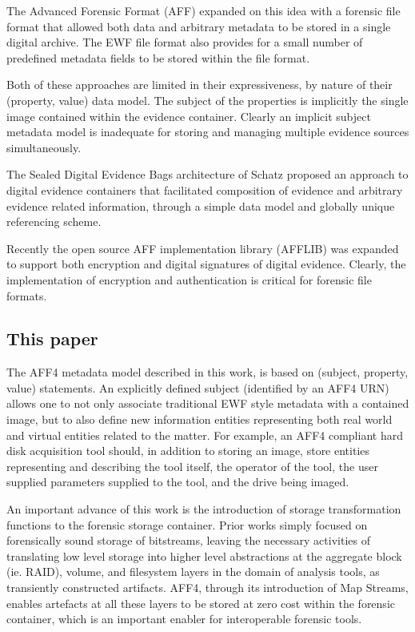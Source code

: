 \documentclass[10pt, conference]{IEEEtran}
\begin{document}
The Advanced Forensic Format (AFF) expanded on this idea with a
forensic file format that allowed both data and arbitrary metadata to
be stored in a single digital archive\cite{garfinkel:aff}. The EWF
file format also provides for a small number of predefined metadata
fields to be stored within the file format\cite{libewf}.

Both of these approaches are limited in their expressiveness, by
nature of their (property, value) data model. The subject of the
properties is implicitly the single image contained within the
evidence container. Clearly an implicit subject metadata model is
inadequate for storing and managing multiple evidence sources
simultaneously.

The Sealed Digital Evidence Bags architecture of Schatz proposed an
approach to digital evidence containers that facilitated composition
of evidence and arbitrary evidence related information, through a
simple data model and globally unique referencing
scheme\cite{schatz:sdeb}. 

Recently the open source AFF implementation library (AFFLIB) was
expanded to support both encryption and digital signatures of digital
evidence\cite{garfinkel:affcrypto}. Clearly, the implementation of
encryption and authentication is critical for forensic file formats.

\subsection{This paper}
The AFF4 metadata model described in this work, is based on (subject,
property, value) statements. An explicitly defined subject (identified
by an AFF4 URN) allows one to not only associate traditional EWF style
metadata with a contained image, but to also define new information
entities representing both real world and virtual entities related to
the matter. For example, an AFF4 compliant hard disk acquisition tool
should, in addition to storing an image, store entities representing
and describing the tool itself, the operator of the tool, the user
supplied parameters supplied to the tool, and the drive being imaged.

An important advance of this work is the introduction of storage transformation
functions to the forensic storage container. Prior works simply focused
on forensically sound storage of bitstreams, leaving the necessary activities
of translating low level storage into higher level abstractions at the 
aggregate block (ie. RAID), volume, and filesystem layers in the domain of 
analysis tools, as transiently constructed artifacts. AFF4, through its introduction 
of Map Streams, enables artefacts at all these layers to be stored at zero cost within
the forensic container, which is an important enabler for interoperable 
forensic tools.
\end{document}
